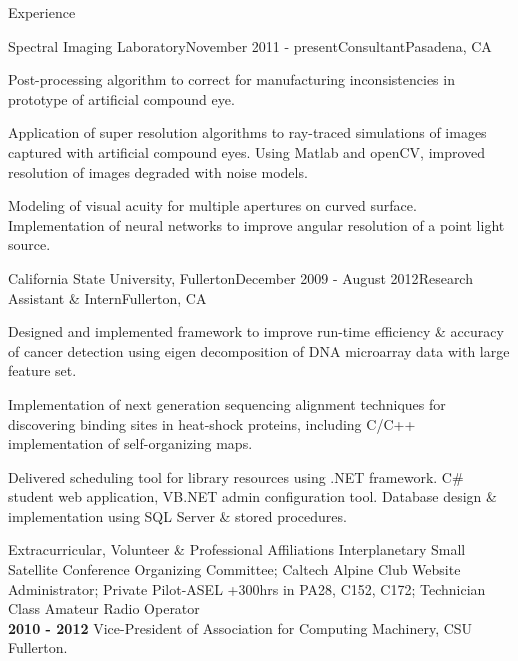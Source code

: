 \documentclass{resume} %
\begin{document}
\begin{rSection}{Experience}

\begin{rSubsection}{Spectral Imaging Laboratory}{November 2011 - present}{Consultant}{Pasadena, CA}
\item Post-processing algorithm to correct for manufacturing inconsistencies in prototype of artificial compound eye.
\item Application of super resolution algorithms to ray-traced simulations of images captured with artificial compound eyes. Using Matlab and openCV, improved resolution of images degraded with noise models.
\item Modeling of visual acuity for multiple apertures on curved surface. Implementation of neural networks to improve angular resolution of a point light source. 
\end{rSubsection}




\begin{rSubsection}{California State University, Fullerton}{December 2009 - August 2012}{Research Assistant \& Intern}{Fullerton, CA}
\item Designed and implemented framework to improve run-time efficiency \& accuracy of cancer detection using eigen decomposition of DNA microarray data with large feature set.
\item Implementation of next generation sequencing alignment techniques for discovering binding sites in heat-shock proteins, including C/C++ implementation of self-organizing maps.
\item Delivered scheduling tool for library resources using .NET framework. C\# student web application, VB.NET admin configuration tool. Database design \& implementation using SQL Server \& stored procedures.
\end{rSubsection}
\end{rSection}


\begin{rSection}{ Extracurricular, Volunteer \& Professional Affiliations}
{\bf } Interplanetary Small Satellite Conference Organizing Committee; Caltech Alpine Club Website Administrator; Private Pilot-ASEL +300hrs in PA28, C152, C172; Technician Class Amateur Radio Operator \\
{\bf 2010 - 2012} Vice-President of Association for Computing Machinery, CSU Fullerton. 
\end{rSection}
\end{document}
